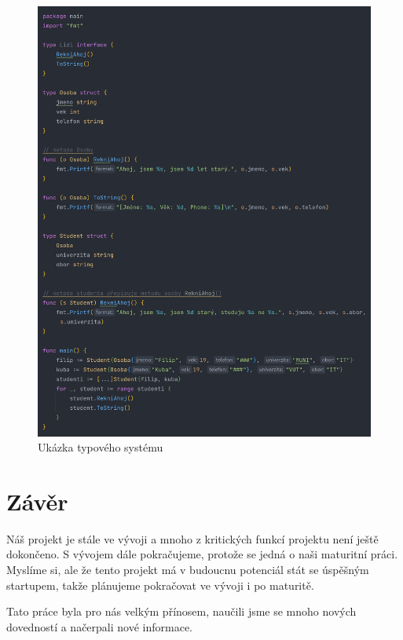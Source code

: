 \documentclass[12pt,a4paper]{article}
\begin{document}
\begin{figure}[h]
	\centering
	\includegraphics[width=\linewidth]{ukazka-kodu.png}
	\caption{Ukázka typového systému}
\end{figure}

\clearpage

\section{Závěr}

Náš projekt je stále ve vývoji a mnoho z kritických funkcí projektu není ještě dokončeno. S vývojem dále pokračujeme, protože se jedná o naši maturitní práci. Myslíme si, ale že tento projekt má v budoucnu potenciál stát se úspěšným startupem, takže plánujeme pokračovat ve vývoji i po maturitě.

Tato práce byla pro nás velkým přínosem, naučili jsme se mnoho nových dovedností a načerpali nové informace.

\clearpage
\end{document}
